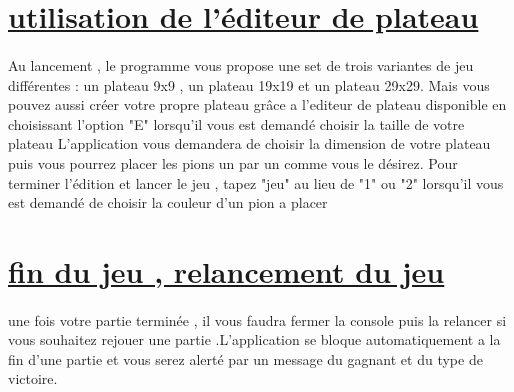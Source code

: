 \documentclass[a4paper,12pt]{article}
\begin{document}
\section{\underline{utilisation de l'éditeur de plateau}}
\paragraph{}
Au lancement , le programme vous propose une set de trois variantes de jeu différentes : un plateau 9x9 , un plateau 19x19 et un plateau 29x29. Mais vous pouvez aussi créer votre propre plateau grâce a l'editeur de plateau disponible en choisissant l'option "E" lorsqu'il vous est demandé choisir la taille de votre plateau
\newline
L'application vous demandera de choisir la dimension de votre plateau puis vous pourrez placer les pions un par un comme vous le désirez. Pour terminer l'édition et lancer le jeu , tapez "jeu" au lieu de "1" ou "2" lorsqu'il vous est demandé de choisir la couleur d'un pion a placer
\newline
\newline
\newline
\section{\underline{fin du jeu , relancement du jeu}}
\paragraph{}une fois votre partie terminée , il vous faudra fermer la console puis la relancer si vous souhaitez rejouer une partie .L'application se bloque automatiquement a la fin d'une partie et vous serez alerté par un message du gagnant et du type de victoire.
\end{document}
